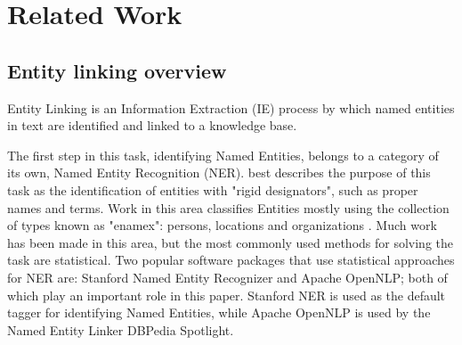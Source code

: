 \section{Related Work} %
\subsection{Entity linking overview} %

Entity Linking is an Information Extraction (IE) process by which named entities in text are identified and linked to a knowledge base.

The first step in this task, identifying Named Entities, belongs to a category of its own, Named Entity Recognition (NER).
\cite{rw_elo_Nadeau2009} best describes the purpose of this task as the identification of entities with "rigid designators",
such as proper names and terms. Work in this area classifies Entities mostly using the collection of types known as "enamex": persons, locations and organizations \cite{rw_elo_Nadeau2009}.
Much work has been made in this area, but the most commonly used methods for solving the task are statistical.
Two popular software packages that use statistical approaches for NER are: Stanford Named Entity Recognizer\cite{rw_elo_finkel2005} and Apache OpenNLP\cite{rw_elo_kottmann2011};
both of which play an important role in this paper. Stanford NER is used as the default tagger for identifying Named Entities,
while Apache OpenNLP is used by the Named Entity Linker DBPedia Spotlight\cite{rw_elo_dbpedia}.








